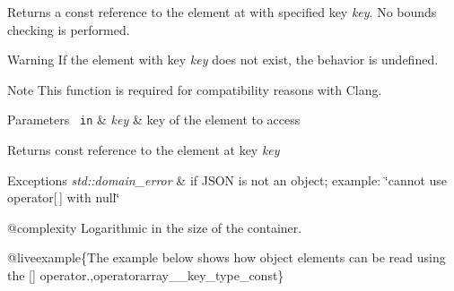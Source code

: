 Returns a const reference to the element at with specified key {\itshape key}. No bounds checking is performed.

\begin{DoxyWarning}{Warning}
If the element with key {\itshape key} does not exist, the behavior is undefined.
\end{DoxyWarning}
\begin{DoxyNote}{Note}
This function is required for compatibility reasons with Clang.
\end{DoxyNote}

\begin{DoxyParams}[1]{Parameters}
\mbox{\texttt{ in}}  & {\em key} & key of the element to access\\
\hline
\end{DoxyParams}
\begin{DoxyReturn}{Returns}
const reference to the element at key {\itshape key} 
\end{DoxyReturn}

\begin{DoxyExceptions}{Exceptions}
{\em std\+::domain\+\_\+error} & if J\+S\+ON is not an object; example\+: {\ttfamily \char`\"{}cannot use
operator\mbox{[}$\,$\mbox{]} with null\char`\"{}}\\
\hline
\end{DoxyExceptions}
@complexity Logarithmic in the size of the container.

@liveexample\{The example below shows how object elements can be read using the {\ttfamily \mbox{[}\mbox{]}} operator.,operatorarray\+\_\+\+\_\+key\+\_\+type\+\_\+const\}

